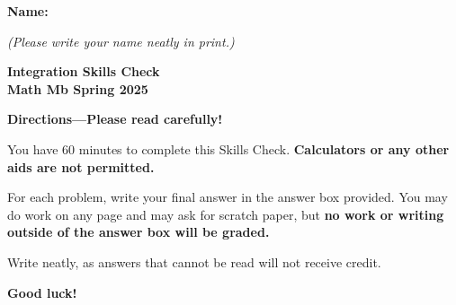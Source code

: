 \documentclass{article}
\begin{document}
 

 \noindent
{\large \mbox{} \hfill \bf Name:\underline{\hspace{2.8in}}}

 {\mbox{} \hfill \it (Please write your name neatly in print.)}


 
\medskip
 
\noindent
{\large\bf
Integration Skills Check \\ Math Mb Spring 2025}
\noindent

{\Large
\begin{center}\textbf{Directions---Please read carefully!} \end{center}}

You have 60 minutes to complete this Skills Check. \textbf{Calculators or any other aids are not permitted.}  


For each problem, write your final answer in the answer box provided. You may do work on any page and may ask for scratch paper, but \textbf{no work or writing outside of the answer box will be graded.}

Write neatly, as answers that cannot be read will not receive credit. 

   

\begin{center}\textbf{Good luck!}\end{center}



\newpage
\end{document}

